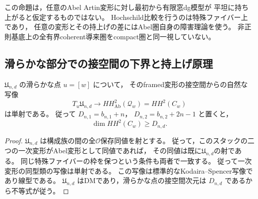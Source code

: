 \begin{remark}
この命題は，任意のAbel Artin変形に対し最初から有限窓dg模型が
平坦に持ち上がると仮定するものではない。
Hochschild比較を行うのは特殊ファイバー上であり，
任意の変形とその持上げの差にはAbel圏自身の障害理論を使う。
非正則基底上の全有界coherent導来圏をcompact圏と同一視していない。
\end{remark}

\subsection{滑らかな部分での接空間の下界と持上げ原理}

\begin{lemma}\label{lem:full-substack-hochschild-lower-bound}
$\mathfrak U_{n,d}$ の滑らかな点 $u=[w]$ について，
そのframed変形の接空間からの自然な写像
\[
 T_u\mathfrak U_{n,d}\longrightarrow HH^2_{\mathrm{Ab}}(\mathcal Q_w)
 =HH^2(C_w)
\]
は単射である。
従って $D_{n,1}=b_{n,1}+n$，
$D_{n,2}=b_{n,2}+2n-1$ と置くと，
\[
 \dim HH^2(C_w)\ge D_{n,d}.
\]
\end{lemma}
\begin{proof}
$\mathfrak U_{n,d}$ は構成族の間の全$\mathcal O$保存同値を射とする。
従って，このスタックの二つの一次変形がAbel変形として同値であれば，
その同値は既に$\mathfrak U_{n,d}$の射である。
同じ特殊ファイバーの枠を保つという条件も両者で一致する。
従って一次変形の同型類の写像は単射である。
この写像は標準的なKodaira--Spencer写像であり線型である。
$\mathfrak U_{n,d}$ はDMであり，滑らかな点の接空間次元は
$D_{n,d}$ であるから不等式が従う。
\end{proof}


